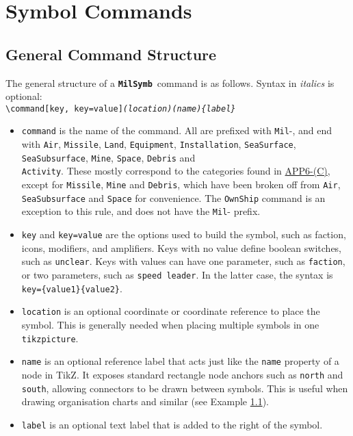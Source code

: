 \documentclass[a4paper, titlepage]{article}
\newcommand\MilSymb{\textbf{\texttt{MilSymb}}}
\newcommand\DocLink{\href{https://www.awl.edu.pl/images/en/APP_6_C.pdf}{APP6-(C)}}
\begin{document}
\section{Symbol Commands}

\subsection{General Command Structure}

The general structure of a \MilSymb\  command is as follows. Syntax in \textit{italics} is optional:\\

\texttt{\textbackslash command[key, key=value]\textit{(location)(name)\{label\}}}

\begin{itemize}
\item \texttt{command} is the name of the command. All are prefixed with \texttt{Mil}-, and end with \texttt{Air}, \texttt{Missile}, \texttt{Land}, \texttt{Equipment}, \texttt{Installation}, \texttt{SeaSurface}, \texttt{SeaSubsurface}, \texttt{Mine}, \texttt{Space}, \texttt{Debris} and\\ \texttt{Activity}. These mostly correspond to the categories found in \DocLink, except for \texttt{Missile}, \texttt{Mine} and \texttt{Debris}, which have been broken off from \texttt{Air}, \texttt{SeaSubsurface} and \texttt{Space} for convenience. The \texttt{OwnShip} command is an exception to this rule, and does not have the \texttt{Mil}- prefix.

\item \texttt{key} and \texttt{key=value} are the options used to build the symbol, such as faction, icons, modifiers, and amplifiers. Keys with no value define boolean switches, such as \texttt{unclear}. Keys with values can have one parameter, such as \texttt{faction}, or two parameters, such as \texttt{speed leader}. In the latter case, the syntax is \texttt{key=\{value1\}\{value2\}}.
\item \texttt{location} is an optional coordinate or coordinate reference to place the symbol. This is generally needed when placing multiple symbols in one \texttt{tikzpicture}.
\item \texttt{name} is an optional reference label that acts just like the \texttt{name} property of a node in TikZ. It exposes standard rectangle node anchors such as \texttt{north} and \texttt{south}, allowing connectors to be drawn between symbols. This is useful when drawing organisation charts and similar (see Example \ref{}).
\item \texttt{label} is an optional text label that is added to the right of the symbol.
\end{itemize}
\end{document}
